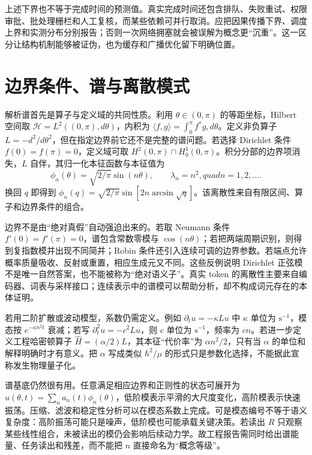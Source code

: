 上述下界也不等于完成时间的预测值。真实完成时间还包含排队、失败重试、权限审批、批处理栅栏和人工复核，而某些依赖可并行取消。应把因果传播下界、调度上界和实测分布分别报告；否则一次网络拥塞就会被误解为概念更“沉重”。这一区分让结构机制能够被证伪，也为缓存和广播优化留下明确位置。

\section{边界条件、谱与离散模式}
\label{sec:topological_boundaries_and_quantization}

解析谱首先是算子与定义域的共同性质。利用 $\theta\in(0,\pi)$ 的等距坐标，Hilbert 空间取 $\mathcal H=L^2((0,\pi),d\theta)$，内积为 $\langle f,g\rangle=\int_0^\pi f^*g,d\theta$。定义非负算子 $L=-d^2/d\theta^2$，但在指定边界前它还不是完整的谱问题。若选择 Dirichlet 条件 $f(0)=f(\pi)=0$，定义域可取 $H^2(0,\pi)\cap H_0^1(0,\pi)$。积分分部的边界项消失，$L$ 自伴，其归一化本征函数与本征值为
\[
\phi_n(\theta)=\sqrt{2/\pi}\sin(n\theta),\qquad \lambda_n=n^2,quad n=1,2,\ldots .
\]
换回 $q$ 即得到 $\phi_n(q)=\sqrt{2/\pi}\sin[2n\arcsin\sqrt q]$。该离散性来自有限区间、算子和边界条件的组合。

边界不是由“绝对真假”自动强迫出来的。若取 Neumann 条件 $f'(0)=f'(\pi)=0$，谱包含常数零模与 $\cos(n\theta)$；若把两端周期识别，则得到复指数模并出现不同简并；Robin 条件还引入连续可调的边界参数。若端点允许概率质量吸收、反射或重置，相应生成元又不同。这些反例说明 Dirichlet 正弦模不是唯一自然答案，也不能被称为“绝对语义子”。真实 token 的离散性主要来自编码器、词表与采样接口；连续表示中的谱模可以帮助分析，却不构成词元存在的本体证明。

若用二阶扩散或波动模型，系数仍需定义。例如 $\partial_tu=-\kappa Lu$ 中 $\kappa$ 单位为 $\mathrm{s}^{-1}$，模态按 $e^{-\kappa n^2t}$ 衰减；若写 $\partial_t^2u=-c^2Lu$，则 $c$ 单位为 $\mathrm{s}^{-1}$，频率为 $cn$。若进一步定义工程哈密顿算子 $\widehat H=(\alpha/2)L$，其本征“代价率”为 $\alpha n^2/2$，只有当 $\alpha$ 的单位和解释明确时才有意义。把 $\alpha$ 写成类似 $\hbar^2/\mu$ 的形式只是参数化选择，不能据此宣称发生物理量子化。

谱基底仍然很有用。任意满足相应边界和正则性的状态可展开为 $u(\theta,t)=\sum_na_n(t)\phi_n(\theta)$，低阶模表示平滑的大尺度变化，高阶模表示快速振荡。压缩、滤波和稳定性分析可以在模态系数上完成。可是模态编号不等于语义复杂度：高阶振荡可能只是噪声，低阶模也可能承载关键决策。若读出 $R$ 只观察某些线性组合，未被读出的模仍会影响后续动力学。故工程报告需同时给出谱能量、任务读出和残差，而不能把 $n$ 直接命名为“概念等级”。

